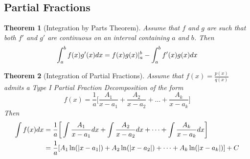 \documentclass[10pt]{article}
\theoremstyle{break}
\newtheorem{thm}{Theorem}[subsection]
\begin{document}
\subsection{Partial Fractions}
\begin{thm}[Integration by Parts Theorem]
Assume that $f$  and $g$  are such that both $f'$ and $g'$ are continuous on an interval containing $a$ and $b$. Then $$\int^b_a f(x)g'(x) \space dx = f(x)g(x)|^b_a - \int^b_a f'(x)g(x) \space dx$$
\end{thm}
\begin{thm}[Integration of Partial Fractions]
    Assume that $f(x) = \frac{p(x)}{q(x)}$ admits a Type I Partial Fraction Decomposition of the form $$f(x) = \dfrac{1}{a}\bigg[\dfrac{A_1}{x - a_1} + \dfrac{A_2}{x - a_2} + \dots + \dfrac{A_k}{x - a_k} \bigg]$$
    Then 
    \begin{align*}
        \int f(x) \space dx &= \dfrac{1}{a}\bigg[\int \dfrac{A_1}{x - a_1} \space dx + \int \dfrac{A_2}{x - a_2} \space dx + \dots + \int \dfrac{A_k}{x - a_k} \space dx \bigg]\\
        &= \dfrac{1}{a}[A_1 \ln (|x - a_1|) + A_2 \ln (|x - a_2|) + \dots + A_k \ln (|x - a_k|)] + C
    \end{align*}
\end{thm}
\end{document}

